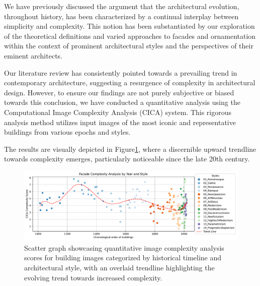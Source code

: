 %    


We have previously discussed the argument that the architectural evolution, throughout history, has been characterized by a continual interplay between simplicity and complexity.
This notion has been substantiated by our exploration of the theoretical definitions and varied approaches to facades and ornamentation within the context of prominent architectural styles and the perspectives of their eminent architects.

Our literature review has consistently pointed towards a prevailing trend in contemporary architecture, suggesting a resurgence of complexity in architectural design.
However, to ensure our findings are not purely subjective or biased towards this conclusion, we have conducted a quantitative analysis using the Computational Image Complexity Analysis (CICA) system.
This rigorous analysis method utilizes input images of the most iconic and representative buildings from various epochs and styles.

The results are visually depicted in Figure\ref{fig:HistoricalComplexityGraph}, where a discernible upward trendline towards complexity emerges, particularly noticeable since the late 20th century.

     \begin{figure}[htb]
          \centering
          \includegraphics[width= \linewidth]{Graphs/complexitygraph}
          \caption{Scatter graph showcasing quantitative image complexity analysis scores for building images categorized by historical timeline and architectural style, with an overlaid trendline highlighting the evolving trend towards increased complexity.}
          \label{fig:HistoricalComplexityGraph}
     \end{figure}









